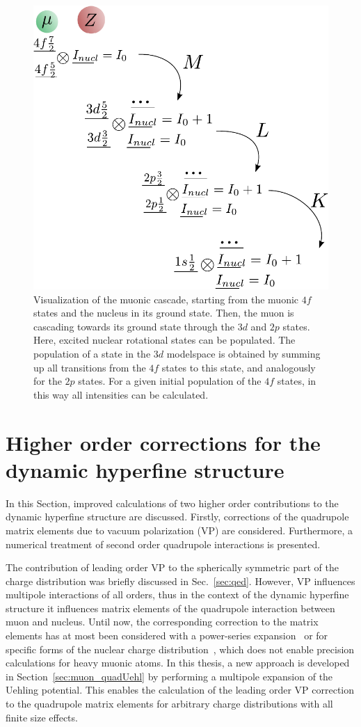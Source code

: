 %
\begin{figure}%
\centering
\includegraphics[width=0.62\linewidth]{pics/cascade.pdf}%
\caption{Visualization of the muonic cascade, starting from the muonic $4f$ states and the nucleus in its ground state. Then, the muon is cascading towards its ground state through the $3d$ and $2p$ states. Here, excited nuclear rotational states can be populated. The population of a state in the $3d$ modelspace is obtained by summing up all transitions from the $4f$ states to this state, and analogously for the $2p$ states. For a given initial population of the $4f$ states, in this way all intensities can be calculated.}%
\label{fig:cascade}%
\end{figure}
%
\newpage
\section{Higher order corrections for the dynamic hyperfine structure}
\label{sec:higherorder}
In this Section, improved calculations of two higher order contributions to the dynamic hyperfine structure are discussed. Firstly, corrections of the quadrupole matrix elements due to vacuum polarization (VP) are considered. Furthermore, a numerical treatment of second order quadrupole interactions is presented.

The contribution of leading order VP to the spherically symmetric part of the charge distribution was briefly discussed in Sec.~\ref{sec:qed}. However, VP influences multipole interactions of all orders, thus in the context of the dynamic hyperfine structure it influences matrix elements of the quadrupole interaction between muon and nucleus. Until now, the corresponding correction to the matrix elements has at most been considered with a power-series expansion~\cite{Fricke1969vp,zehnder1975} or for specific forms of the nuclear charge distribution~\cite{pearson1963}, which does not enable precision calculations for heavy muonic atoms. In this thesis, a new approach is developed in Section~\ref{sec:muon_quadUehl} by performing a multipole expansion of the Uehling potential. This enables the calculation of the leading order VP correction to the quadrupole matrix elements for arbitrary charge distributions with all finite size effects.


